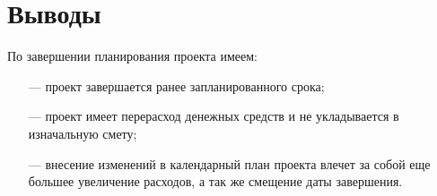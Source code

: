 \chapter{Выводы}

По завершении планирования проекта имеем:
\begin{itemize}
    \item[---] проект завершается ранее запланированного срока;
    \item[---] проект имеет перерасход денежных средств и не укладывается в изначальную смету;
    \item[---] внесение изменений в календарный план проекта влечет за собой еще большее увеличение расходов, а так же смещение даты завершения.
\end{itemize}